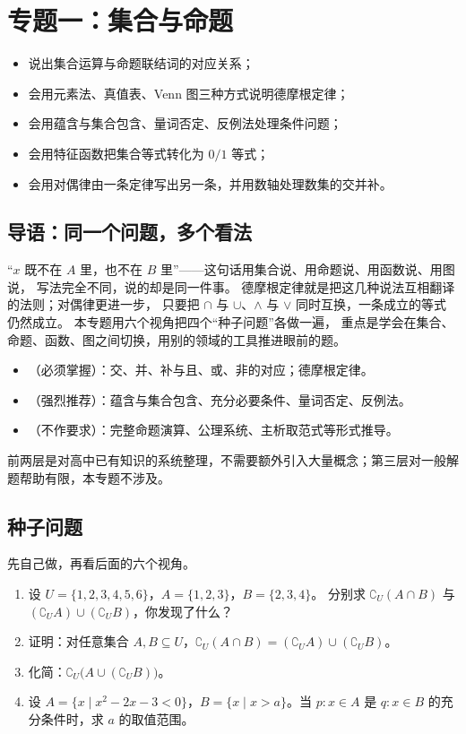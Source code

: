 \section{专题一：集合与命题}

\begin{learnobjective}
\begin{itemize}
  \item 说出集合运算与命题联结词的对应关系；
  \item 会用元素法、真值表、Venn 图三种方式说明德摩根定律；
  \item 会用蕴含与集合包含、量词否定、反例法处理条件问题；
  \item 会用特征函数把集合等式转化为 $0/1$ 等式；
  \item 会用对偶律由一条定律写出另一条，并用数轴处理数集的交并补。
\end{itemize}
\end{learnobjective}

\begin{preview}
\subsection{导语：同一个问题，多个看法}
“$x$ 既不在 $A$ 里，也不在 $B$ 里”——这句话用集合说、用命题说、用函数说、用图说，
写法完全不同，说的却是同一件事。
德摩根定律就是把这几种说法互相翻译的法则；对偶律更进一步，
只要把 $\cap$ 与 $\cup$、$\land$ 与 $\lor$ 同时互换，一条成立的等式仍然成立。
本专题用六个视角把四个“种子问题”各做一遍，
重点是学会在集合、命题、函数、图之间切换，用别的领域的工具推进眼前的题。

\begin{itemize}
  \item {}（必须掌握）：交、并、补与且、或、非的对应；德摩根定律。
  \item {}（强烈推荐）：蕴含与集合包含、充分必要条件、量词否定、反例法。
  \item {}（不作要求）：完整命题演算、公理系统、主析取范式等形式推导。
\end{itemize}
前两层是对高中已有知识的系统整理，不需要额外引入大量概念；第三层对一般解题帮助有限，本专题不涉及。

\subsection{种子问题}
先自己做，再看后面的六个视角。
\begin{enumerate}
  \item 设 $U=\{1,2,3,4,5,6\}$，$A=\{1,2,3\}$，$B=\{2,3,4\}$。
        分别求 $\complement_U(A\cap B)$ 与 $(\complement_U A)\cup(\complement_U B)$，你发现了什么？
  \item 证明：对任意集合 $A,B\subseteq U$，$\complement_U(A\cap B)=(\complement_U A)\cup(\complement_U B)$。
  \item 化简：$\complement_U\big(A\cup(\complement_U B)\big)$。
  \item 设 $A=\{x\mid x^2-2x-3<0\}$，$B=\{x\mid x>a\}$。当 $p:x\in A$ 是 $q:x\in B$ 的充分条件时，求 $a$ 的取值范围。
\end{enumerate}
\end{preview}

